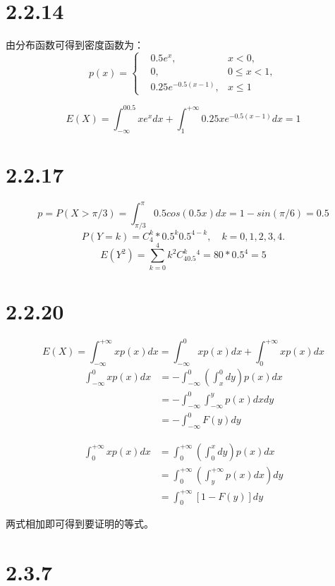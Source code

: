 \documentclass{article}
\begin{document}
\section{2.2.14}

由分布函数可得到密度函数为：
\begin{equation}
p(x)=
\left\{
\begin{aligned}
&0.5e^x,&x<0,\\
&0,&0\leq x <1,\\
&0.25e^{-0.5(x-1)},&x\leq1
\end{aligned}
\right.
\end{equation}


$$E(X)=\int_{-\infty}^00.5xe^xdx+\int_1^{+\infty}0.25xe^{-0.5(x-1)}dx=1$$
\section{2.2.17}
$$p=P(X>\pi/3)=\int_{\pi/3}^\pi0.5cos(0.5x)dx=1-sin(\pi/6)=0.5$$
$$P(Y=k)=C^k_4*0.5^k0.5^{4-k},\quad k=0,1,2,3,4.$$
$$E(Y^2)=\sum^4_{k=0}k^2C^k_40.5^4=80*0.5^4=5$$
\section{2.2.20}
$$E(X)=\int^{+\infty}_{-\infty}xp(x)dx=\int_{-\infty}^0xp(x)dx+\int^{+\infty}_0xp(x)dx$$
\begin{equation}
\begin{aligned}
\int_{-\infty}^0xp(x)dx&=-\int^0_{-\infty}(\int^0_xdy)p(x)dx\\
&=-\int^0_{-\infty}\int^y_{-\infty}p(x)dxdy\\
&=-\int^0_{-\infty}F(y)dy
\end{aligned}
\end{equation}

\begin{equation}
\begin{aligned}
\int^{+\infty}_0xp(x)dx&=\int_0^{+\infty}(\int_0^xdy)p(x)dx\\
&=\int_0^{+\infty}(\int_y^{+\infty}p(x)dx)dy\\
&=\int_0^{+\infty}[1-F(y)]dy
\end{aligned}
\end{equation}

两式相加即可得到要证明的等式。

\section{2.3.7}
\end{document}
